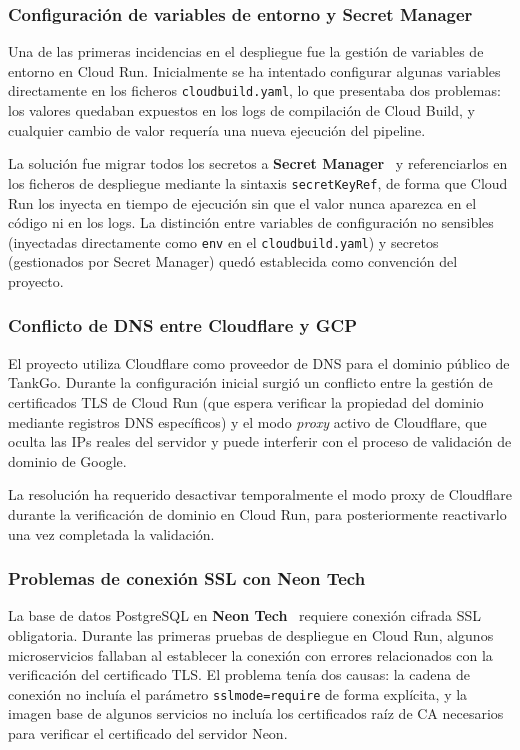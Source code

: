 \subsubsection*{Configuración de variables de entorno y Secret Manager}

Una de las primeras incidencias en el despliegue fue la gestión de variables de entorno
en Cloud Run. Inicialmente se ha intentado configurar algunas variables directamente en los
ficheros \texttt{cloudbuild.yaml}, lo que presentaba dos problemas: los valores quedaban
expuestos en los logs de compilación de Cloud Build, y cualquier cambio de valor requería
una nueva ejecución del pipeline.

La solución fue migrar todos los secretos a \textbf{Secret Manager}~\cite{secret_manager}
y referenciarlos en los ficheros de despliegue mediante la sintaxis
\texttt{secretKeyRef}, de forma que Cloud Run los inyecta en tiempo de ejecución sin que
el valor nunca aparezca en el código ni en los logs. La distinción entre variables de
configuración no sensibles (inyectadas directamente como \texttt{env} en el
\texttt{cloudbuild.yaml}) y secretos (gestionados por Secret Manager) quedó establecida
como convención del proyecto.

\subsubsection*{Conflicto de DNS entre Cloudflare y GCP}

El proyecto utiliza Cloudflare como proveedor de DNS para el dominio público de TankGo.
Durante la configuración inicial surgió un conflicto entre la gestión de certificados TLS
de Cloud Run (que espera verificar la propiedad del dominio mediante registros DNS
específicos) y el modo \textit{proxy} activo de Cloudflare, que oculta las IPs reales
del servidor y puede interferir con el proceso de validación de dominio de Google.

La resolución ha requerido desactivar temporalmente el modo proxy de Cloudflare durante la
verificación de dominio en Cloud Run, para posteriormente reactivarlo una vez completada
la validación.

\subsubsection*{Problemas de conexión SSL con Neon Tech}

La base de datos PostgreSQL en \textbf{Neon Tech}~\cite{neon_tech2026} requiere conexión
cifrada SSL obligatoria. Durante las primeras pruebas de despliegue en Cloud Run, algunos
microservicios fallaban al establecer la conexión con errores relacionados con la
verificación del certificado TLS. El problema tenía dos causas: la cadena de conexión no
incluía el parámetro \texttt{sslmode=require} de forma explícita, y la imagen base de
algunos servicios no incluía los certificados raíz de CA necesarios para verificar el
certificado del servidor Neon.

